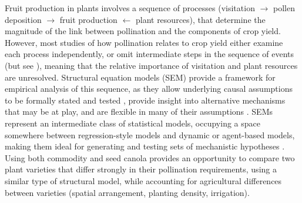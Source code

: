 \documentclass[12pt, draft]{article} %
\begin{document}

Fruit production in plants involves a sequence of processes (visitation $\rightarrow$ pollen deposition $\rightarrow$ fruit production $\leftarrow$ plant resources), that determine the magnitude of the link between pollination and the components of crop yield.
However, most studies of how pollination relates to crop yield either examine each process independently, or omit intermediate steps in the sequence of events (but see \citealp{saez2018}), meaning that the relative importance of visitation and plant resources are unresolved.
Structural equation models (SEM) provide a framework for empirical analysis of this sequence, as they allow underlying causal assumptions to be formally stated and tested \citep{shipley2009, grace2012}, provide insight into alternative mechanisms that may be at play, and are flexible in many of their assumptions \citep{clough2012}.
SEMs represent an intermediate class of statistical models, occupying a space somewhere between regression-style models and dynamic or agent-based models, making them ideal for generating and testing sets of mechanistic hypotheses \citep{grace2006, kline2013}. 
Using both commodity and seed canola provides an opportunity to compare two plant varieties that differ strongly in their pollination requirements, using a similar type of structural model, while accounting for agricultural differences between varieties (spatial arrangement, planting density, irrigation).
\end{document}
